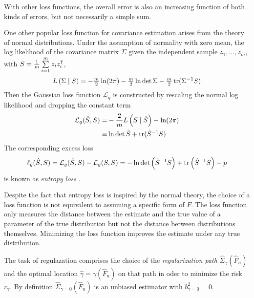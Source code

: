 With other loss functions, the overall error is also an increasing function of both kinds of errors, but not necessarily a simple sum.

One other popular loss function for covariance estimation arises from the theory of normal distributions.  Under the assumption of normality  with zero mean, the log likelihood of the covariance matrix $\Sigma$ given the independent sample $z_1,\ldots,z_m$, with $S = \tfrac 1 m \sum\limits_{i=1}^m z_i z_i^\intercal$,  
\begin{equation}
L\left(\Sigma \mid S\right) = -\tfrac m 2 \ln(2\pi) - \tfrac m 2 \ln \det \Sigma - \tfrac m 2 \operatorname{tr}(\Sigma^{-1} S)
\end{equation}
Then the Gaussian loss function $\mathcal L_g$ is constructed by rescaling the normal log likelihood and dropping the constant term
\begin{equation}
\begin{split}
\mathcal L_g(\hat S,S) = &-\frac 2 m L\left(S \mid \hat S \right) - \ln(2\pi) 
\\ 
\equiv & \ln \det \hat S + \operatorname{tr}(\hat S^{-1} S) 
\end{split}
\end{equation}
The corresponding excess loss 
\begin{equation}
\ell_g(\hat S,S) = \mathcal L_g(\hat S,S) - \mathcal L_g(S,S) 
= -\ln \det \left(\hat S^{-1} S\right) + \operatorname{tr}\left(\hat S^{-1}S\right) - p
\end{equation}
is known as \emph{entropy loss} \citep{James:1961}.

Despite the fact that entropy loss is inspired by the normal theory, the choice of a loss function is not equivalent to assuming a specific form of $F$. The loss function only measures the distance between the estimate and the true value of a parameter of the true distribution but not the distance between distributions themselves. Minimizing the loss function improves the estimate under any true distribution.

The task of regulazation comprises the choice of the \emph{regularization path} $\hat \Sigma_\gamma(\hat F_n)$ and the optimal location $\hat\gamma = \gamma(\hat F_n)$ on that path in oder to minimize the risk $r_\gamma$.  
By definition $\hat\Sigma_{\gamma=0}(\hat F_n)$ is an unbiased estimator with $b_{\gamma=0}^2 = 0$. 


